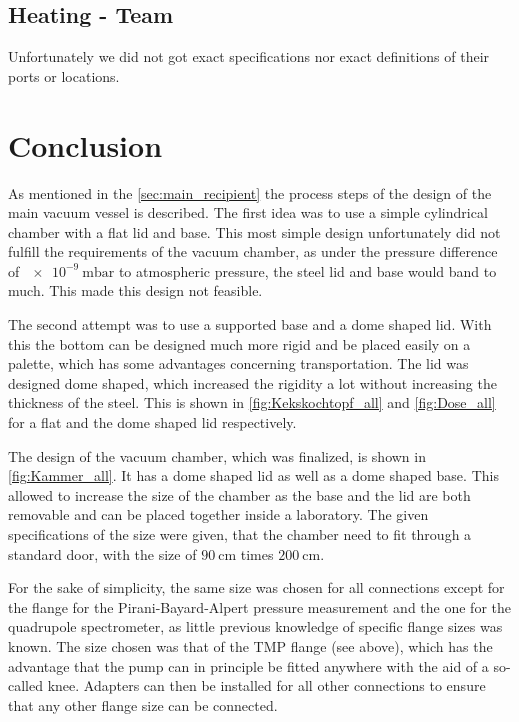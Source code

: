 \subsection{Heating - Team}
%
Unfortunately we did not got exact specifications nor exact definitions of their ports or locations.



\section{Conclusion}

As mentioned in the \autoref{sec:main_recipient} the process steps of the design of the main vacuum vessel is described.
The first idea was to use a simple cylindrical chamber with a flat lid and base.
This most simple design unfortunately did not fulfill the requirements of the vacuum chamber, as under the pressure difference of $\SI{e-9}{\milli\bar}$ to atmospheric pressure, the steel lid and base would band to much.
This made this design not feasible.

The second attempt was to use a supported base and a dome shaped lid.
With this the bottom can be designed much more rigid and be placed easily on a palette, which has some advantages concerning transportation.
The lid was designed dome shaped, which increased the rigidity a lot without increasing the thickness of the steel.
This is shown in \autoref{fig:Kekskochtopf_all} and \autoref{fig:Dose_all} for a flat and the dome shaped lid respectively.

The design of the vacuum chamber, which was finalized, is shown in \autoref{fig:Kammer_all}.
It has a dome shaped lid as well as a dome shaped base.
This allowed to increase the size of the chamber as the base and the lid are both removable and can be placed together inside a laboratory.
The given specifications of the size were given, that the chamber need to fit through a standard door, with the size of $\SI{90}{\centi\meter}$ times $\SI{200}{\centi\meter}$.

For the sake of simplicity, the same size was chosen for all connections except for the flange for the Pirani-Bayard-Alpert pressure measurement and the one for the quadrupole spectrometer, as little previous knowledge of specific flange sizes was known.
The size chosen was that of the TMP flange (see above), which has the advantage that the pump can in principle be fitted anywhere with the aid of a so-called knee.
Adapters can then be installed for all other connections to ensure that any other flange size can be connected.


